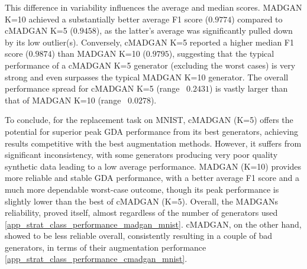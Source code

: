 This difference in variability influences the average and median scores. MADGAN K=10 achieved a substantially better average F1 score ($0.9774$) compared to cMADGAN K=5 ($0.9458$), as the latter's average was significantly pulled down by its low outlier(s). Conversely, cMADGAN K=5 reported a higher median F1 score ($0.9874$) than MADGAN K=10 ($0.9795$), suggesting that the typical performance of a cMADGAN K=5 generator (excluding the worst cases) is very strong and even surpasses the typical MADGAN K=10 generator. The overall performance spread for cMADGAN K=5 (range ~$0.2431$) is vastly larger than that of MADGAN K=10 (range ~$0.0278$).

To conclude, for the replacement task on MNIST, cMADGAN (K=5) offers the potential for superior peak GDA performance from its best generators, achieving results competitive with the best augmentation methods. However, it suffers from significant inconsistency, with some generators producing very poor quality synthetic data leading to a low average performance. MADGAN (K=10) provides more reliable and stable GDA performance, with a better average F1 score and a much more dependable worst-case outcome, though its peak performance is slightly lower than the best of cMADGAN (K=5). Overall, the MADGANs reliability, proved itself, almost regardless of the number of generators used \ref{app_strat_class_performance_madgan_mnist}. cMADGAN, on the other hand, showed to be less reliable overall, consistently resulting in a couple of bad generators, in terms of their augmentation performance \ref{app_strat_class_performance_cmadgan_mnist}.


